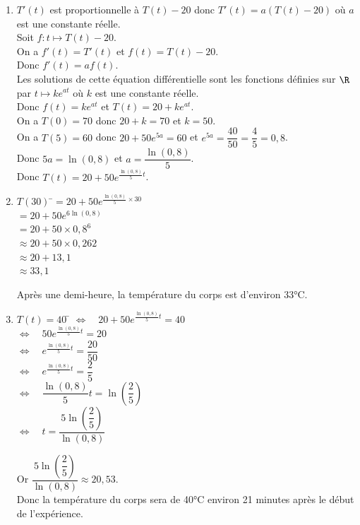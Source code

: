 \documentclass[a4paper,11pt,exos]{nsi} %
\begin{document}
\textcolor{UGLiBlue}{
    \begin{enumerate}
        \item $T'(t)$ est proportionnelle à $T(t)-20$ donc $T'(t)=a(T(t)-20)$ où $a$ est une constante réelle.\\
        Soit $f:t\mapsto T(t)-20$.\\
        On a $f'(t)=T'(t)$ et $f(t)=T(t)-20$.\\
        Donc $f'(t)=af(t)$.\\[1em]
        Les solutions de cette équation différentielle sont les fonctions définies sur $\R$ par $t\mapsto ke^{at}$ où $k$ est une constante réelle.\\
        Donc $f(t)=ke^{at}$ et $T(t)=20+ke^{at}$.\\
        On a $T(0)=70$ donc $20+k=70$ et $k=50$.\\
        On a $T(5)=60$ donc $20+50e^{5a}=60$ et $e^{5a}=\dfrac{40}{50}=\dfrac{4}{5}=0,8$.\\
        Donc $5a=\ln(0,8)$ et $a=\dfrac{\ln(0,8)}{5}$.\\
        Donc $T(t)=20+50e^{\frac{\ln(0,8)}{5}t}$.
        \item \begin{tabbing}
            $T(30)$ \=$=20+50e^{\frac{\ln(0,8)}{5}\times 30}$\\
            \> $=20+50e^{6\ln(0,8)}$\\
            \> $=20+50\times 0,8^6$\\
            \> $\approx 20+50\times 0,262$\\
            \> $\approx 20+13,1$\\
            \> $\approx 33,1$
        \end{tabbing}
        Après une demi-heure, la température du corps est d'environ 33°C.
        \item \begin{tabbing}
            $T(t)=40$ \= $\iff \quad 20+50e^{\frac{\ln(0,8)}{5}t}=40$\\
            \> $\iff \quad 50e^{\frac{\ln(0,8)}{5}t}=20$\\
            \> $\iff \quad e^{\frac{\ln(0,8)}{5}t}=\dfrac{20}{50}$\\
            \> $\iff \quad e^{\frac{\ln(0,8)}{5}t}=\dfrac{2}{5}$\\
            \> $\iff \quad \dfrac{\ln(0,8)}{5}t=\ln\left(\dfrac{2}{5}\right)$\\
            \> $\iff \quad t=\dfrac{5\ln\left(\dfrac{2}{5}\right)}{\ln(0,8)}$
        \end{tabbing}
        Or $\dfrac{5\ln\left(\dfrac{2}{5}\right)}{\ln(0,8)}\approx 20,53$.\\
        Donc la température du corps sera de 40°C environ 21 minutes après le début de l'expérience.
    \end{enumerate}
}
\end{document}
